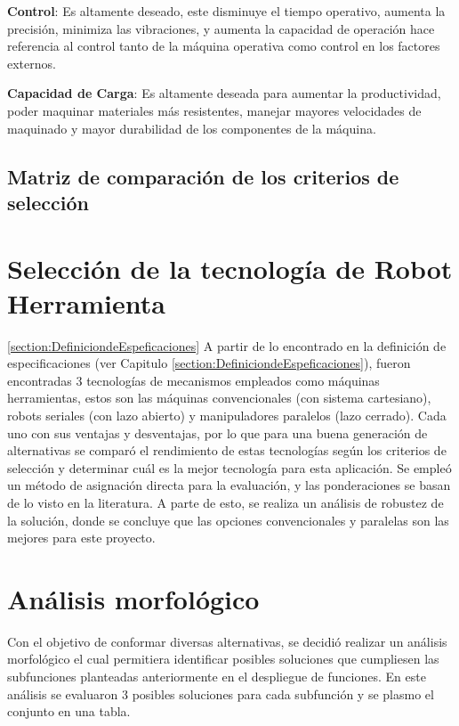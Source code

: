 \textbf{Control}: Es altamente deseado, este disminuye el tiempo operativo, aumenta la precisión, minimiza las vibraciones, y aumenta la capacidad de operación hace referencia al control tanto de la máquina operativa como control en los factores externos.

\textbf{Capacidad de Carga}: Es altamente deseada para aumentar la productividad, poder maquinar materiales más resistentes, manejar mayores velocidades de maquinado y mayor durabilidad de los componentes de la máquina.

\subsection{Matriz de comparación de los criterios de selección}
\begin{landscape}
    
\end{landscape}

\section{Selección de la tecnología de Robot Herramienta}
\ref{section:DefiniciondeEspeficaciones}
A partir de lo encontrado en la definición de especificaciones (ver Capitulo \ref{section:DefiniciondeEspeficaciones}), fueron encontradas 3 tecnologías de mecanismos empleados como máquinas herramientas, estos son las máquinas convencionales (con sistema cartesiano), robots seriales (con lazo abierto) y manipuladores paralelos (lazo cerrado). Cada uno con sus ventajas y desventajas, por lo que para una buena generación de alternativas se comparó el rendimiento de estas tecnologías según los criterios de selección y determinar cuál es la mejor tecnología para esta aplicación. Se empleó un método de asignación directa para la evaluación, y las ponderaciones se basan de lo visto en la literatura. A parte de esto, se realiza un análisis de robustez de la solución, donde se concluye que las opciones convencionales y paralelas son las mejores para este proyecto.



\section{Análisis morfológico}

Con el objetivo de conformar diversas alternativas, se decidió realizar un análisis morfológico el cual permitiera identificar posibles soluciones que cumpliesen las subfunciones planteadas anteriormente en el despliegue de funciones. En este análisis se evaluaron 3 posibles soluciones para cada subfunción y se plasmo el conjunto en una tabla.


